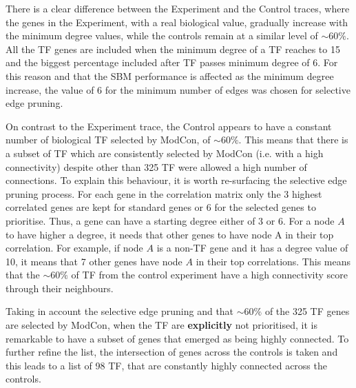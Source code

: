 There is a clear difference between the Experiment and the Control traces, where the genes in the Experiment, with a real biological value, gradually increase with the minimum degree values, while the controls remain at a similar level of $\sim60\%$. All the TF genes are included when the minimum degree of a TF reaches to 15 and the biggest percentage included after TF passes minimum degree of 6. For this reason and that the SBM performance is affected as the minimum degree increase, the value of 6 for the minimum number of edges was chosen for selective edge pruning.


On contrast to the Experiment trace, the Control appears to have a constant number of biological TF selected by ModCon, of $\sim60\%$. This means that there is a subset of TF which are consistently selected by ModCon (i.e. with a high connectivity) despite other than 325 TF were allowed a high number of connections. To explain this behaviour, it is worth re-surfacing the selective edge pruning process. For each gene in the correlation matrix only the 3 highest correlated genes are kept for standard genes or 6 for the selected genes to prioritise. Thus, a gene can have a starting degree either of 3 or 6. For a node $A$ to have higher a degree, it needs that other genes to have node A in their top correlation. For example, if node $A$ is a non-TF gene and it has a degree value of 10, it means that 7 other genes have node $A$ in their top correlations. This means that the  $\sim60\%$ of TF from the control experiment have a high connectivity score through their neighbours.

Taking in account the selective edge pruning and that $\sim60\%$ of the 325 TF genes are selected by ModCon, when the TF are \textbf{explicitly} not prioritised, it is remarkable to have a subset of genes that emerged as being highly connected. To further refine the list, the intersection of genes across the controls is taken and this leads to a list of 98 TF, that are constantly highly connected across the controls. 

